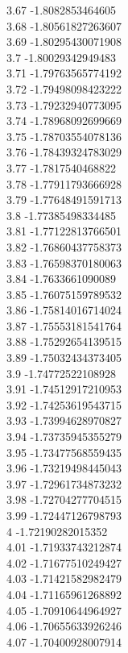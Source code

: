 {3.67	-1.8082853464605\\
3.68	-1.80561827263607\\
3.69	-1.80295430071908\\
3.7	-1.80029342949483\\
3.71	-1.79763565774192\\
3.72	-1.79498098423222\\
3.73	-1.79232940773095\\
3.74	-1.78968092699669\\
3.75	-1.78703554078136\\
3.76	-1.78439324783029\\
3.77	-1.7817540468822\\
3.78	-1.77911793666928\\
3.79	-1.77648491591713\\
3.8	-1.77385498334485\\
3.81	-1.77122813766501\\
3.82	-1.76860437758373\\
3.83	-1.76598370180063\\
3.84	-1.7633661090089\\
3.85	-1.76075159789532\\
3.86	-1.75814016714024\\
3.87	-1.75553181541764\\
3.88	-1.75292654139515\\
3.89	-1.75032434373405\\
3.9	-1.74772522108928\\
3.91	-1.74512917210953\\
3.92	-1.74253619543715\\
3.93	-1.73994628970827\\
3.94	-1.73735945355279\\
3.95	-1.73477568559435\\
3.96	-1.73219498445043\\
3.97	-1.72961734873232\\
3.98	-1.72704277704515\\
3.99	-1.72447126798793\\
4	-1.72190282015352\\
4.01	-1.71933743212874\\
4.02	-1.71677510249427\\
4.03	-1.71421582982479\\
4.04	-1.71165961268892\\
4.05	-1.70910644964927\\
4.06	-1.70655633926246\\
4.07	-1.70400928007914\\
}
